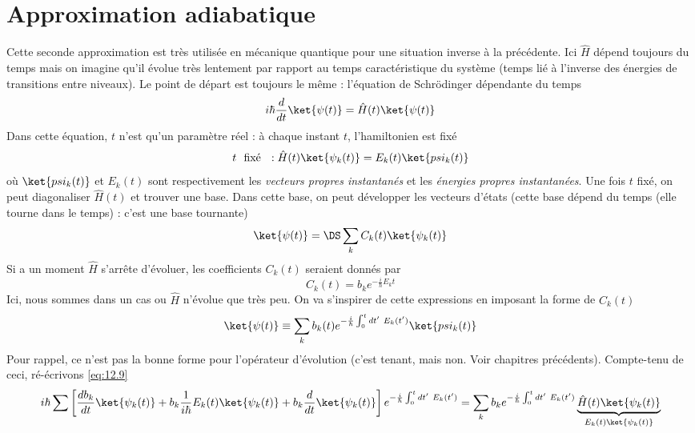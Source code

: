 \section{Approximation adiabatique}
Cette seconde approximation est très utilisée en mécanique quantique pour une situation inverse 
à la précédente. Ici $\hat{H}$ dépend toujours du temps mais on imagine qu'il évolue très lentement 
par rapport au temps caractéristique du système (temps lié à l'inverse des énergies de transitions 
entre niveaux). Le point de départ est toujours le même : l'équation de Schrödinger dépendante du 
temps
\begin{equation}
i\hbar \frac{d}{dt}\ket{\psi(t)} = \hat{H}(t)\ket{\psi(t)}
\label{eq:12.9}
\end{equation}
Dans cette équation, $t$  n'est qu'un paramètre réel : à chaque instant $t$, l'hamiltonien est fixé
\begin{equation}
t\ \text{ fixé }\ : \hat{H}(t)\ket{\psi_k(t)} = E_k(t)\ket{psi_k(t)}
\label{eq:12.10}
\end{equation}
où $\ket{psi_k(t)}$ et $E_k(t)$ sont respectivement les \textit{vecteurs propres instantanés} et 
les \textit{énergies propres instantanées}. Une fois $t$ fixé, on peut diagonaliser $\hat{H}(t)$ 
et trouver une base. Dans cette base, on peut développer les vecteurs d'états (cette base 
dépend du temps (elle tourne dans le temps) : c'est une base tournante)
\begin{equation}
\ket{\psi(t)} =\DS \sum_k C_k(t)\ket{\psi_k(t)}
\end{equation}
Si a un moment $\hat{H}$ s'arrête d'évoluer, les coefficients $C_k(t)$ seraient donnés par
\begin{equation}
C_k(t) = b_ke^{-\frac{i}{\hbar}E_kt}
\end{equation}
Ici, nous sommes dans un cas ou $\hat{H}$ n'évolue que très peu. On va s'inspirer de cette 
expressions en imposant la forme de $C_k(t)$
\begin{equation}
\ket{\psi(t)} \equiv \sum_k b_k(t)e^{-\frac{i}{\hbar}\int_0^t dt'\ E_k(t')}\ket{psi_k(t)}
\end{equation}
Pour rappel, ce n'est pas la bonne forme pour l’opérateur d'évolution (c'est tenant, mais non. 
Voir chapitres précédents). Compte-tenu de ceci, ré-écrivons \eqref{eq:12.9}
\begin{equation}
i\hbar\sum\left[\dfrac{db_k}{dt}\ket{\psi_k(t)} + b_k\frac{1}{i\hbar}E_k(t)\ket{\psi_k(t)} + b_k
\dfrac{d}{dt}\ket{\psi_k(t)}\right]e^{-\frac{i}{\hbar}\int_0^t dt'\ E_k(t')} = \sum_k b_k 
e^{-\frac{i}{\hbar}\int_0^t dt'\ E_k(t')}\underbrace{\hat{H}(t)\ket{\psi_k(t)}}_{E_k(t)\ket{\psi_k(t)}}
\end{equation}
